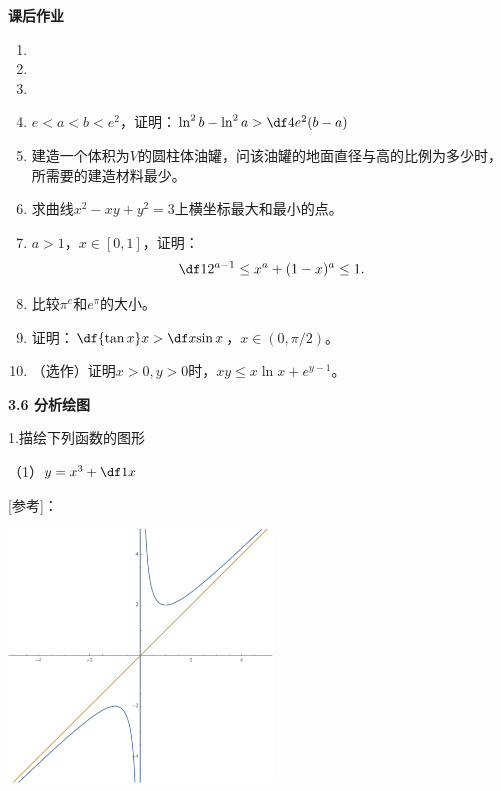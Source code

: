 \begin{ext}
	{\bf 课后作业}
	
	\begin{enumerate}
	  \item 
	  \item 
	  \item 
	  \item $e<a<b<e^2$，证明：$\ln^2b-\ln^2a>\df4{e^2}(b-a)$
	  \item 建造一个体积为$V$的圆柱体油罐，问该油罐的地面直径与高的比例为多少时，
	  所需要的建造材料最少。
	  \item 求曲线$x^2-xy+y^2=3$上横坐标最大和最小的点。
	  \item $a>1$，$x\in[0,1]$，证明：
	  $$\df1{2^{a-1}}\leq x^a+(1-x)^a\leq 1.$$
	  \item 比较$\pi^e$和$e^{\pi}$的大小。
	  \item 证明：$\df{\tan x}x>\df x{\sin x}$，$x\in(0,\pi/2)$。
	  \item （选作）证明$x>0,y>0$时，$xy\leq x\ln x+e^{y-1}$。
	\end{enumerate}
\end{ext}

\begin{center}
	\bf 3.6 分析绘图
\end{center}

\bigskip

1.描绘下列函数的图形

（1）$y=x^3+\df1x$

[参考]：
\begin{center}
	\includegraphics[width=7cm]{./images/ch3/x1x.pdf}
\end{center}

